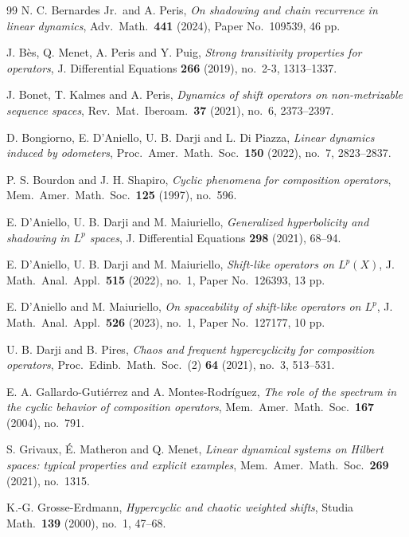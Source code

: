 \documentclass[12pt]{amsart}
\theoremstyle{theorem}
\theoremstyle{definition}
\theoremstyle{remark} \theoremstyle{question} \theoremstyle{example}
\begin{document}
\begin{thebibliography}{99}
 N. C. Bernardes Jr.\ and A. Peris,
    \textit{On shadowing and chain recurrence in linear dynamics}, Adv.\ Math.\ {\bf 441} (2024), Paper No.\ 109539, 46 pp.

 J. B\`es, Q. Menet, A. Peris and Y. Puig,
     {\it Strong transitivity properties for operators}, J. Differential Equations {\bf 266} (2019), no.\ 2-3, 1313--1337.

 J. Bonet, T. Kalmes and A. Peris,
    {\it Dynamics of shift operators on non-metrizable sequence spaces}, Rev.\ Mat.\ Iberoam.\ {\bf 37} (2021), no.\ 6, 2373--2397.

 D. Bongiorno, E. D'Aniello, U. B. Darji and L. Di Piazza,
    {\it Linear dynamics induced by odometers}, Proc.\ Amer.\ Math.\ Soc.\ {\bf 150} (2022), no.\ 7, 2823--2837.
    
 P. S. Bourdon and J. H. Shapiro,
    {\it Cyclic phenomena for composition operators}, Mem.\ Amer.\ Math.\ Soc.\ {\bf 125} (1997), no.\ 596.

 E. D'Aniello, U. B. Darji and M. Maiuriello,
    {\it Generalized hyperbolicity and shadowing in $L^p$ spaces}, J. Differential Equations {\bf 298} (2021), 68--94.

 E. D'Aniello, U. B. Darji and M. Maiuriello,
    {\it Shift-like operators on $L^p(X)$}, J. Math.\ Anal.\ Appl.\ {\bf 515} (2022), no.\ 1, Paper No.\ 126393, 13 pp.

 E. D'Aniello and M. Maiuriello,
    {\it On spaceability of shift-like operators on $L^p$}, J. Math.\ Anal.\ Appl.\ {\bf 526} (2023), no.\ 1, Paper No.\ 127177, 10 pp.

 U. B. Darji and B. Pires,
    {\it Chaos and frequent hypercyclicity for composition operators}, Proc.\ Edinb.\ Math.\ Soc.\ (2) {\bf 64} (2021), no.\ 3, 513--531.
 
 E. A. Gallardo-Guti\'errez and A. Montes-Rodr\'iguez,
    {\it The role of the spectrum in the cyclic behavior of composition operators}, Mem.\ Amer.\ Math.\ Soc.\ {\bf 167} (2004), no.\ 791.

 S. Grivaux, \'E. Matheron and Q. Menet,
     {\it Linear dynamical systems on Hilbert spaces: typical properties and explicit examples}, 
    Mem.\ Amer.\ Math.\ Soc.\ {\bf 269} (2021), no.\ 1315.

 K.-G. Grosse-Erdmann, 
    {\it Hypercyclic and chaotic weighted shifts}, Studia Math.\ {\bf 139} (2000), no.\ 1, 47--68.


\end{thebibliography}
\end{document}
